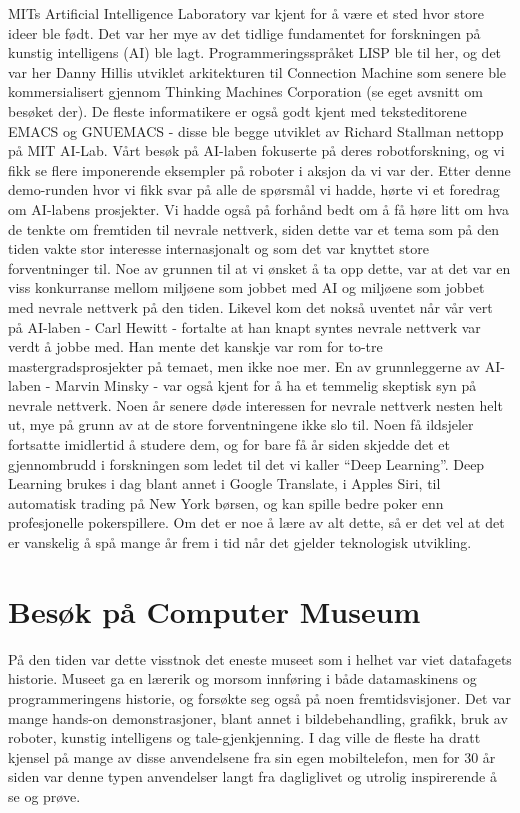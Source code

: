 \documentclass[../../main.tex]{subfiles}
\begin{document}
MITs Artificial Intelligence Laboratory var kjent for å være et sted hvor store ideer ble født. Det var her mye av det tidlige fundamentet for forskningen på kunstig intelligens (AI) ble lagt. Programmeringsspråket LISP ble til her, og det var her Danny Hillis utviklet arkitekturen til Connection Machine som senere ble kommersialisert gjennom Thinking Machines Corporation (se eget avsnitt om besøket der). De fleste informatikere er også godt kjent med teksteditorene EMACS og GNUEMACS - disse ble begge utviklet av Richard Stallman nettopp på MIT AI-Lab. Vårt besøk på AI-laben fokuserte på deres robotforskning, og vi fikk se flere imponerende eksempler på roboter i aksjon da vi var der. Etter denne demo-runden hvor vi fikk svar på alle de spørsmål vi hadde, hørte vi et foredrag om AI-labens prosjekter. Vi hadde også på forhånd bedt om å få høre litt om hva de tenkte om fremtiden til nevrale nettverk, siden dette var et tema som på den tiden vakte stor interesse internasjonalt og som det var knyttet store forventninger til. Noe av grunnen til at vi ønsket å ta opp dette, var at det var en viss konkurranse mellom miljøene som jobbet med AI og miljøene som jobbet med nevrale nettverk på den tiden. Likevel kom det nokså uventet når vår vert på AI-laben - Carl Hewitt - fortalte at han knapt syntes nevrale nettverk var verdt å jobbe med. Han mente det kanskje var rom for to-tre mastergradsprosjekter på temaet, men ikke noe mer. En av grunnleggerne av AI-laben - Marvin Minsky - var også kjent for å ha et temmelig skeptisk syn på nevrale nettverk. Noen år senere døde interessen for nevrale nettverk nesten helt ut, mye på grunn av at de store forventningene ikke slo til. Noen få ildsjeler fortsatte imidlertid å studere dem, og for bare få år siden skjedde det et gjennombrudd i forskningen som ledet til det vi kaller “Deep Learning”. Deep Learning brukes i dag blant annet i Google Translate, i Apples Siri, til automatisk trading på New York børsen, og kan spille bedre poker enn profesjonelle pokerspillere. Om det er noe å lære av alt dette, så er det vel at det er vanskelig å spå mange år frem i tid når det gjelder teknologisk utvikling. 

\section{Besøk på Computer Museum}

På den tiden var dette visstnok det eneste museet som i helhet var viet datafagets historie. Museet ga en lærerik og morsom innføring i både datamaskinens og programmeringens historie, og forsøkte seg også på noen fremtidsvisjoner. Det var mange hands-on demonstrasjoner, blant annet i bildebehandling, grafikk, bruk av roboter, kunstig intelligens og tale-gjenkjenning. I dag ville de fleste ha dratt kjensel på mange av disse anvendelsene fra sin egen mobiltelefon, men for 30 år siden var denne typen anvendelser langt fra dagliglivet og utrolig inspirerende å se og prøve. 
\end{document}
